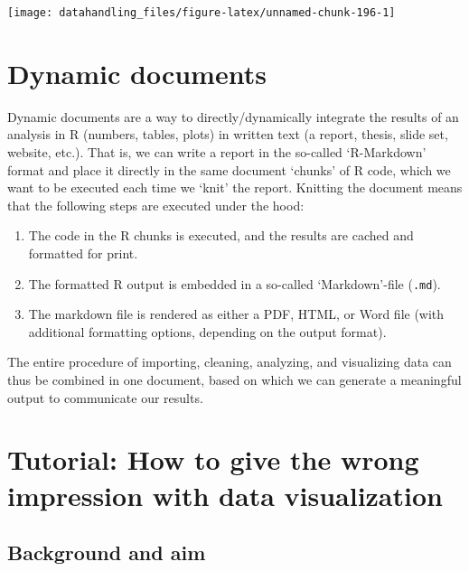 \documentclass[
  12pt,
]{style/krantz}
\providecommand{\tightlist}{%
  \setlength{\itemsep}{0pt}\setlength{\parskip}{0pt}}
\begin{document}
\texttt{[image: datahandling\_files/figure-latex/unnamed-chunk-196-1]}

\hypertarget{dynamic-documents}{%
\section{Dynamic documents}\label{dynamic-documents}}

Dynamic documents are a way to directly/dynamically integrate the results of an analysis in R (numbers, tables, plots) in written text (a report, thesis, slide set, website, etc.). That is, we can write a report in the so-called `R-Markdown' format and place it directly in the same document `chunks' of R code, which we want to be executed each time we `knit' the report. Knitting the document means that the following steps are executed under the hood:

\begin{enumerate}
\def\labelenumi{\arabic{enumi}.}
\tightlist
\item
  The code in the R chunks is executed, and the results are cached and formatted for print.
\item
  The formatted R output is embedded in a so-called `Markdown'-file (\texttt{.md}).
\item
  The markdown file is rendered as either a PDF, HTML, or Word file (with additional formatting options, depending on the output format).
\end{enumerate}

The entire procedure of importing, cleaning, analyzing, and visualizing data can thus be combined in one document, based on which we can generate a meaningful output to communicate our results.

\hypertarget{tutorial-how-to-give-the-wrong-impression-with-data-visualization}{%
\section{Tutorial: How to give the wrong impression with data visualization}\label{tutorial-how-to-give-the-wrong-impression-with-data-visualization}}

\hypertarget{background-and-aim}{%
\subsection{Background and aim}\label{background-and-aim}}
\end{document}
